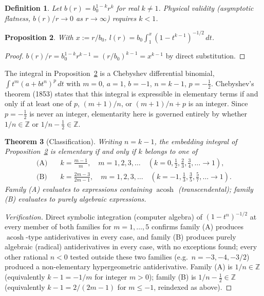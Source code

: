 \documentclass[12pt]{amsart}
\theoremstyle{plain}
\newtheorem{theorem}{Theorem}[section]
\newtheorem{proposition}[theorem]{Proposition}
\newtheorem{definition}[theorem]{Definition}
\theoremstyle{remark}
\begin{document}
\begin{definition}
Let $b(r)=b_0^{1-k}r^k$ for real $k\ne1$. Physical validity (asymptotic flatness, $b(r)/r\to0$ as $r\to\infty$) requires $k<1$.
\end{definition}

\begin{proposition}\label{prop:reduce}
With $x:=r/b_0$, $l(r)=b_0\int_1^x(1-t^{k-1})^{-1/2}\,dt$.
\end{proposition}

\begin{proof}
$b(r)/r=b_0^{1-k}r^{k-1}=(r/b_0)^{k-1}=x^{k-1}$ by direct substitution.
\end{proof}

The integral in Proposition~\ref{prop:reduce} is a Chebyshev differential binomial, $\int t^m(a+bt^n)^p\,dt$ with $m=0$, $a=1$, $b=-1$, $n=k-1$, $p=-\tfrac12$. Chebyshev's theorem (1853) states that this integral is expressible in elementary terms if and only if at least one of $p$, $(m+1)/n$, or $(m+1)/n+p$ is an integer. Since $p=-\tfrac12$ is never an integer, elementarity here is governed entirely by whether $1/n\in\mathbb Z$ or $1/n-\tfrac12\in\mathbb Z$.

\begin{theorem}[Classification]\label{thm:classify}
Writing $n=k-1$, the embedding integral of Proposition~\ref{prop:reduce} is elementary if and only if $k$ belongs to one of
\begin{align}
\text{(A)}\quad & k=\frac{m-1}{m}, \quad m=1,2,3,\dots \quad(k=0,\tfrac12,\tfrac23,\tfrac34,\dots\to1), \tag{5}\\
\text{(B)}\quad & k=\frac{2m-3}{2m-1}, \quad m=1,2,3,\dots \quad(k=-1,\tfrac13,\tfrac35,\tfrac57,\dots\to1). \tag{6}
\end{align}
Family (A) evaluates to expressions containing $\operatorname{acosh}$ (transcendental); family (B) evaluates to purely algebraic expressions.
\end{theorem}

\begin{proof}[Verification]
Direct symbolic integration (computer algebra) of $(1-t^n)^{-1/2}$ at every member of both families for $m=1,\dots,5$ confirms family (A) produces $\operatorname{acosh}$-type antiderivatives in every case, and family (B) produces purely algebraic (radical) antiderivatives in every case, with no exceptions found; every other rational $n<0$ tested outside these two families (e.g.\ $n=-3,-4,-3/2$) produced a non-elementary hypergeometric antiderivative. Family (A) is $1/n\in\mathbb Z$ (equivalently $k-1=-1/m$ for integer $m>0$); family (B) is $1/n-\tfrac12\in\mathbb Z$ (equivalently $k-1=2/(2m-1)$ for $m\le -1$, reindexed as above).
\end{proof}
\end{document}
